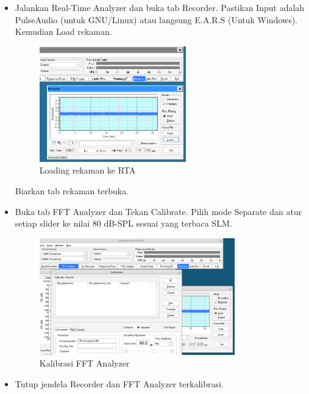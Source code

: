 \documentclass{article}
\begin{document}
	\begin{itemize}
		\item Jalankan Real-Time Analyzer dan buka tab Recorder.
		Pastikan Input adalah PulseAudio (untuk GNU/Linux) atau langsung E.A.R.S (Untuk Windows).
		Kemudian Load rekaman.

		\begin{figure}[H]
			\centering
			\includegraphics[width=0.6\textwidth,angle=0]{images/rta_load}
			\caption{Loading rekaman ke RTA}
		\end{figure}

		Biarkan tab rekaman terbuka.

		\item Buka tab FFT Analyzer dan Tekan Calibrate.
		Pilih mode Separate dan atur setiap slider ke nilai 80 dB-SPL sesuai yang terbaca SLM.

		\begin{figure}[H]
			\centering
			\includegraphics[width=0.8\textwidth,angle=0]{images/rta_calib}
			\caption{Kalibrasi FFT Analyzer}
		\end{figure}

		\item Tutup jendela Recorder dan FFT Analyzer terkalibrasi.


\end{itemize}
\end{document}
